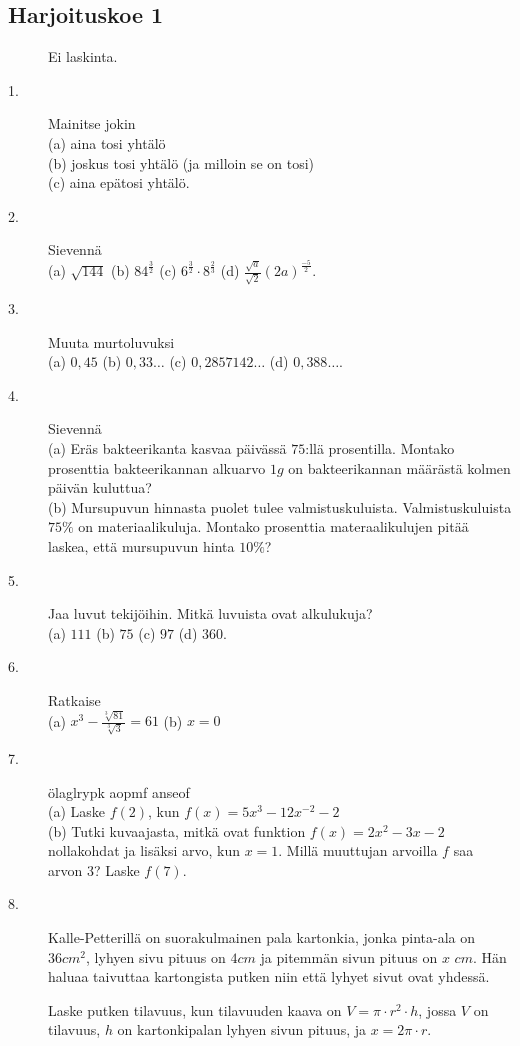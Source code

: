 \subsection*{Harjoituskoe 1}


\begin{description}
	\item[] Ei laskinta.
	\item[1.] Mainitse jokin \\
	(a) aina tosi yhtälö \\
	(b) joskus tosi yhtälö (ja milloin se on tosi) \\
	(c) aina epätosi yhtälö.
	\item[2.] Sievennä \\
	(a) $\sqrt{144}$ \qquad
	(b) $84^\frac{3}{2}$ \qquad
	(c) $ 6^\frac{3}{2}\cdot 8^\frac{2}{3} $ \qquad
	(d) $\frac{\sqrt{a}}{\sqrt{2}}(2a)^{\frac{-5}{2}}$.
	\item[3.] Muuta murtoluvuksi \\
	(a) $0,45$ \qquad
	(b) $0,33\ldots$ \qquad
	(c) $0,2857142\ldots$ \qquad
	(d) $0,388\ldots$.
	\item[4.] Sievennä \\
	(a) Eräs bakteerikanta kasvaa päivässä $75$:llä prosentilla. Montako prosenttia bakteerikannan alkuarvo $1 g$ on bakteerikannan määrästä kolmen päivän kuluttua? \\
	(b) Mursupuvun hinnasta puolet tulee valmistuskuluista. Valmistuskuluista $75\%$ on materiaalikuluja. Montako prosenttia materaalikulujen pitää laskea, että mursupuvun hinta $10\%$? \qquad
	\item[5.] Jaa luvut tekijöihin. Mitkä luvuista ovat alkulukuja? \\
	(a) $111$ \qquad
	(b) $75$ \qquad
	(c) $97$ \qquad
	(d) $360$.
	\item[6.] Ratkaise \\
	(a) $x^3 - \frac{\sqrt[3]{81}}{\sqrt[3]{3}} = 61$ \qquad
	(b) $x=0$
	\item[7.] ölaglrypk aopmf anseof  \\
	(a) Laske $f(2)$, kun $f(x)=5x^{3}-12x^{-2}-2$ \\
	(b) Tutki kuvaajasta, mitkä ovat funktion $f(x)=2x^2-3x-2$ nollakohdat ja lisäksi arvo, kun $x=1$. Millä muuttujan arvoilla $f$ saa arvon $3$? Laske $f(7)$.
	
	\begin{center}
		\begin{kuvaajapohja}{1.0}{-3}{5}{-4}{4}
		\end{kuvaajapohja}
	\end{center}

	\item[8.] Kalle-Petterillä on suorakulmainen pala kartonkia, jonka pinta-ala on $36cm^2$, lyhyen sivu pituus on $4cm$ ja pitemmän sivun pituus on $x$ $cm$. 
	Hän haluaa taivuttaa kartongista putken niin että lyhyet sivut ovat yhdessä. 
	
	Laske putken tilavuus, kun tilavuuden kaava on $V=\pi\cdot r^2\cdot h$, jossa $V$ on tilavuus, $h$ on kartonkipalan lyhyen sivun pituus, ja $x=2\pi\cdot r$.    
\end{description}

